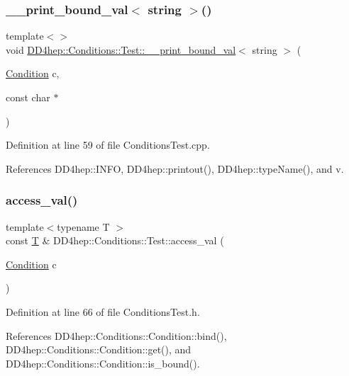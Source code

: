 \subsubsection{\texorpdfstring{\+\_\+\+\_\+print\+\_\+bound\+\_\+val$<$ string $>$()}{\_\_print\_bound\_val< string >()}}
{\footnotesize\ttfamily template$<$$>$ \\
void \hyperlink{namespace_d_d4hep_1_1_conditions_1_1_test_ab03a688e791c0dd4e363d9a61beb6d65}{D\+D4hep\+::\+Conditions\+::\+Test\+::\+\_\+\+\_\+print\+\_\+bound\+\_\+val}$<$ string $>$ (\begin{DoxyParamCaption}\item[{\hyperlink{class_d_d4hep_1_1_conditions_1_1_condition}{Condition}}]{c,  }\item[{const char $\ast$}]{ }\end{DoxyParamCaption})}



Definition at line 59 of file Conditions\+Test.\+cpp.



References D\+D4hep\+::\+I\+N\+FO, D\+D4hep\+::printout(), D\+D4hep\+::type\+Name(), and v.

\hypertarget{namespace_d_d4hep_1_1_conditions_1_1_test_a3ba37d0927b4cfc9bd6e93185512de49}{}\label{namespace_d_d4hep_1_1_conditions_1_1_test_a3ba37d0927b4cfc9bd6e93185512de49} 
\subsubsection{\texorpdfstring{access\+\_\+val()}{access\_val()}}
{\footnotesize\ttfamily template$<$typename T $>$ \\
const \hyperlink{class_t}{T} \& D\+D4hep\+::\+Conditions\+::\+Test\+::access\+\_\+val (\begin{DoxyParamCaption}\item[{\hyperlink{class_d_d4hep_1_1_conditions_1_1_condition}{Condition}}]{c }\end{DoxyParamCaption})}



Definition at line 66 of file Conditions\+Test.\+h.



References D\+D4hep\+::\+Conditions\+::\+Condition\+::bind(), D\+D4hep\+::\+Conditions\+::\+Condition\+::get(), and D\+D4hep\+::\+Conditions\+::\+Condition\+::is\+\_\+bound().

